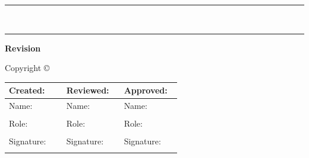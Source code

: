 \begin{titlepage}
\thispagestyle{empty}
\setlength{\parindent}{0mm}
\setlength{\parskip}{0mm}
\rule{\linewidth}{1mm}
\begin{flushleft}
  {\Huge\textbf{\VarTitle}}\\[5mm]
  \VarSubtitle
\end{flushleft}
\rule{\linewidth}{1mm}
\begin{center}
  {\large\textbf{Revision \VarRevisionNumber}}\\
  \VarDate
\end{center}
\begin{center}
  {\large{}Copyright \copyright{} \VarCopyrightHolder}\\
  \VarAuthor
\end{center}

\begin{tabular}{|p{0.3\linewidth}|p{0.3\linewidth}|p{0.3\linewidth}|}
  \hline
  \textbf{Created:} & \textbf{Reviewed:} & \textbf{Approved:} \\
  \hline
  \footnotesize{Name:} & \footnotesize{Name:} & \footnotesize{Name:} \\
  & & \\[0.1cm]
  \footnotesize{Role:} & \footnotesize{Role:} & \footnotesize{Role:} \\
  & & \\[0.1cm]
  \footnotesize{Signature:} & \footnotesize{Signature:} & \footnotesize{Signature:} \\
  & & \\[1cm]
  \hline
\end{tabular}
\end{titlepage}
